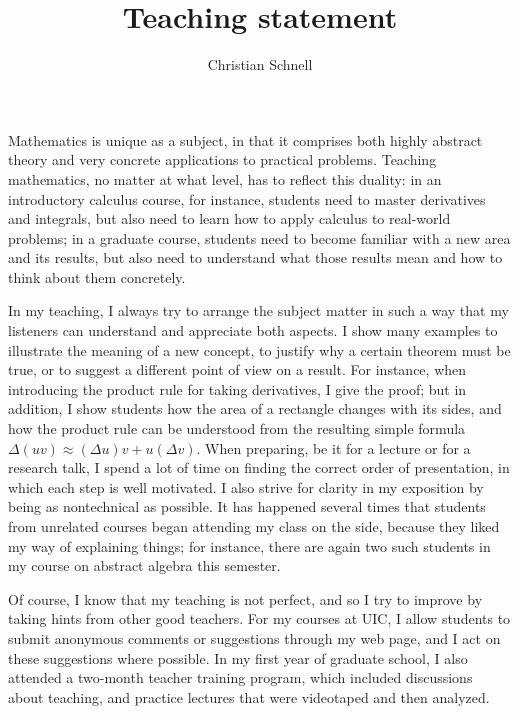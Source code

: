 \documentclass[11pt]{amsart}
\begin{document}
\title{Teaching statement}
\author{Christian Schnell}
\maketitle
\thispagestyle{empty}


Mathematics is unique as a subject, in that it comprises both highly abstract theory
and very concrete applications to practical problems. Teaching mathematics, no matter
at what level, has to reflect this duality: in an introductory calculus course, for
instance, students need to master derivatives and integrals, but also need to learn
how to apply calculus to real-world problems; in a graduate course, students need to
become familiar with a new area and its results, but also need to understand what
those results mean and how to think about them concretely.

In my teaching, I always try to arrange the subject matter in such a way that my
listeners can understand and appreciate both aspects. I show many examples to
illustrate the meaning of a new concept, to justify why a certain theorem must be
true, or to suggest a different point of view on a result. For instance,
when introducing the product rule for taking derivatives, I give the proof; but in
addition, I show students how the area of a rectangle changes with its sides, and how
the product rule can be understood from the resulting simple formula $\Delta(uv)
\approx (\Delta u)v + u (\Delta v)$. When preparing, be it for a lecture or for a
research talk, I spend a lot of time on finding the correct order of presentation, in
which each step is well motivated. I also strive for clarity in my exposition by
being as nontechnical as possible. It has happened several times that students from
unrelated courses began attending my class on the side, because they liked my way of
explaining things; for instance, there are again two such students in my course on abstract
algebra this semester.

Of course, I know that my teaching is not perfect, and so I try to improve by
taking hints from other good teachers. For my courses at UIC, I allow students to
submit anonymous comments or suggestions through my web page, and I act on these
suggestions where possible. In my first year of graduate school, I also attended a
two-month teacher training program, which included discussions about teaching, and
practice lectures that were videotaped and then analyzed. 
\end{document}
